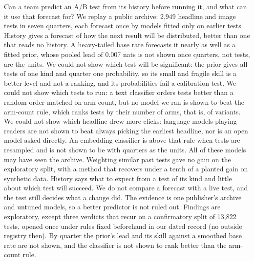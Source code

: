Can a team predict an A/B test from its history before running it, and what can it use that forecast for? We replay a public archive: 2,949 headline and image tests in seven quarters, each forecast once by models fitted only on earlier tests. History gives a forecast of how the next result will be distributed, better than one that reads no history. A heavy-tailed base rate forecasts it nearly as well as a fitted prior, whose pooled lead of 0.007 nats is not shown once quarters, not tests, are the units. We could not show which test will be significant: the prior gives all tests of one kind and quarter one probability, so its small and fragile skill is a better level and not a ranking, and its probabilities fail a calibration test. We could not show which tests to run: a text classifier orders tests better than a random order matched on arm count, but no model we ran is shown to beat the arm-count rule, which ranks tests by their number of arms, that is, of variants. We could not show which headline drew more clicks: language models playing readers are not shown to beat always picking the earliest headline, nor is an open model asked directly. An embedding classifier is above that rule when tests are resampled and is not shown to be with quarters as the units. All of these models may have seen the archive. Weighting similar past tests gave no gain on the exploratory split, with a method that recovers under a tenth of a planted gain on synthetic data. History says what to expect from a test of its kind and little about which test will succeed. We do not compare a forecast with a live test, and the test still decides what a change did. The evidence is one publisher's archive and untuned models, so a better predictor is not ruled out. Findings are exploratory, except three verdicts that recur on a confirmatory split of 13,822 tests, opened once under rules fixed beforehand in our dated record (no outside registry then). By quarter the prior's lead and its skill against a smoothed base rate are not shown, and the classifier is not shown to rank better than the arm-count rule.
